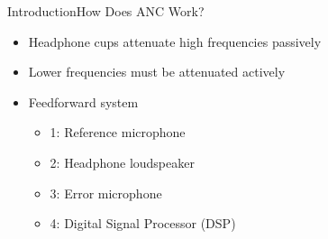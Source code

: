 \begin{frame}{Introduction}{How Does ANC Work?}		
	\begin{itemize}
		\item Headphone cups attenuate high frequencies passively
		\item Lower frequencies must be attenuated actively 
		\item Feedforward system
		\begin{itemize}
			\item 1: Reference microphone
			\item 2: Headphone loudspeaker
			\item 3: Error microphone
			\item 4: Digital Signal Processor (DSP)
		\end{itemize}
	\end{itemize}
	\begin{center}
	 	
	\end{center}
\end{frame}



